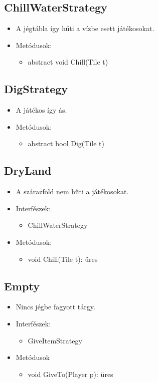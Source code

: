 \subsection{ChillWaterStrategy}
\begin{itemize}
	\item A jégtábla így hűti a vízbe esett játékosokat.
	
\item Metódusok:
\begin{itemize}
	\item abstract void Chill(Tile t)
\end{itemize}
\end{itemize}

\subsection{DigStrategy}
\begin{itemize}
	\item A játékos így ás.
	
\item Metódusok:
\begin{itemize}
	\item abstract bool Dig(Tile t)
\end{itemize}
\end{itemize}

\subsection{DryLand}
\begin{itemize}
	\item A szárazföld nem hűti a játékosokat.
	
\item Interfészek:
	\begin{itemize}
		\item ChillWaterStrategy
	\end{itemize}
\item Metódusok:
\begin{itemize}
	\item void Chill(Tile t): üres
\end{itemize}
\end{itemize}

\subsection{Empty}
\begin{itemize}
	\item Nincs jégbe fagyott tárgy.
	
\item Interfészek:
	\begin{itemize}
		\item GiveItemStrategy
	\end{itemize}
\item Metódusok
\begin{itemize}
	\item void GiveTo(Player p): üres
\end{itemize}
\end{itemize}

